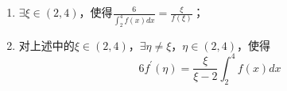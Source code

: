\begin{enumerate}
\begin{enumerate}
	\item 
	$\exists \xi \in(2,4) $，使得$  \frac{6}{\int_2^4 f(x) d x}=\frac{\xi}{f(\xi)}$；
	
	\item 
	对上述中的$\xi \in(2,4) $，$  \exists \eta \neq \xi $，$  \eta \in(2,4)$，使得
	\[
	6 f^{\prime}(\eta)=\frac{\xi}{\xi-2} \int_2^4 f(x) d x
	\]
	
\end{enumerate}





\end{enumerate}

















